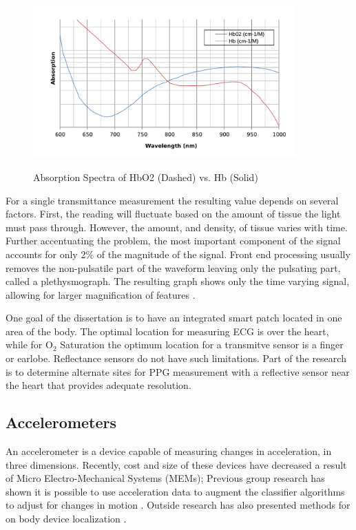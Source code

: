 \begin{figure}
	\begin{center}
		\label{fig:Hemoglobin}
		\includegraphics[scale=1,width=0.9\textwidth]{Images/hemoglobin.pdf} 
		\caption{Absorption Spectra of HbO2 (Dashed) vs. Hb (Solid) }
	\end{center}
\end{figure}

For a single transmittance measurement the resulting value depends on several factors. First, the reading will fluctuate based on the amount of tissue the light must pass through. However, the amount, and density, of tissue varies with time. Further accentuating the problem, the most important component of the signal accounts for only 2\% of the magnitude of the signal. Front end processing usually removes the non-pulsatile part of the waveform leaving only the pulsating part, called a plethysmograph. The resulting graph shows only the time varying signal, allowing for larger magnification of features \cite{Jawahar2009}.

One goal of the dissertation is to have an integrated smart patch located in one area of the body. The optimal location for measuring ECG is over the heart, while for O$_2$ Saturation the optimum location for a transmitve sensor is a finger or earlobe. Reflectance sensors do not have such limitations. Part of the research is to determine alternate sites for PPG measurement with a reflective sensor near the heart that provides adequate resolution.

\subsection{Accelerometers}
\label{subsec:Accelerometers}
An accelerometer is a device capable of measuring changes in acceleration, in three dimensions. Recently, cost and size of these devices have decreased a result of Micro Electro-Mechanical Systems (MEMs);  Previous group research has shown it is possible to use acceleration data to augment the classifier algorithms to adjust for changes in motion \cite{Shannon2012}.  Outside research has also presented methods for on body device localization \cite{Vahdatpour2011}. 

